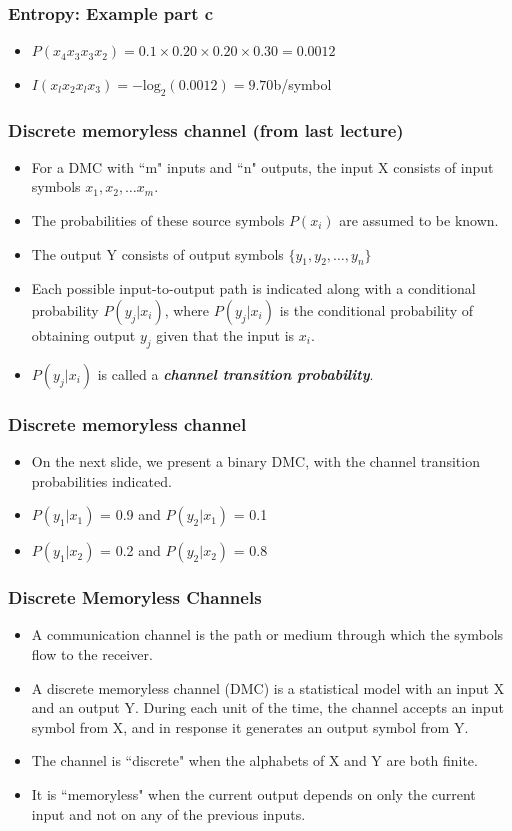 \documentclass[a4]{beamer}
\begin{document}
\begin{frame}
\frametitle{Entropy: Example part c}
\begin{itemize}
\item $P(x_4x_3x_3x_2) = 0.1\times 0.20 \times 0.20 \times 0.30  = 0.0012$ \bigskip
\item $I(x_lx_2x_lx_3) = -\mbox{log}_2(0.0012)  = 9.70$b/symbol \bigskip
\end{itemize}
\end{frame}
\begin{frame}
\frametitle{Discrete memoryless channel (from last lecture)}
\begin{itemize}
	\item For a DMC with ``m" inputs and ``n" outputs, the input X consists of input symbols $x_1, x_2, \ldots x_m$.
	\item The probabilities of these source symbols $P(x_i)$ are assumed to be known.
	\item The output Y consists of output symbols $\{y_1,y_2,\ldots, y_n \}$
	\item Each possible input-to-output path is indicated along with a conditional probability $P(y_j|x_i)$, where $P(y_j|x_i)$  is the conditional probability of
	obtaining output $y_j$ given that the input is $x_i$. \item $P(y_j|x_i)$ is called a \textbf{\emph{channel transition probability}}.
\end{itemize}
\end{frame}
\begin{frame}
\frametitle{Discrete memoryless channel}
\begin{itemize}
\item On the next slide, we present a binary DMC, with the channel transition probabilities indicated.
\item $P(y_1|x_1)$ = 0.9  and $P(y_2|x_1)$ = 0.1
\item $P(y_1|x_2)$ = 0.2  and $P(y_2|x_2)$ = 0.8
\end{itemize}
\end{frame}
\begin{frame} \frametitle{Discrete Memoryless Channels}
\begin{itemize}
\item A communication channel is the path or medium through which the symbols flow to the receiver. \item A discrete memoryless channel (DMC) is a statistical model with an input X and an output Y.
During each unit of the time, the channel accepts an input symbol from X, and in
response it generates an output symbol from Y. 

\item  The channel is ``discrete" when the alphabets of X and
Y are both finite.\item It is ``memoryless" when the current output depends on only the current input and
not on any of the previous inputs.\end{itemize}
\end{frame}
\end{document}
